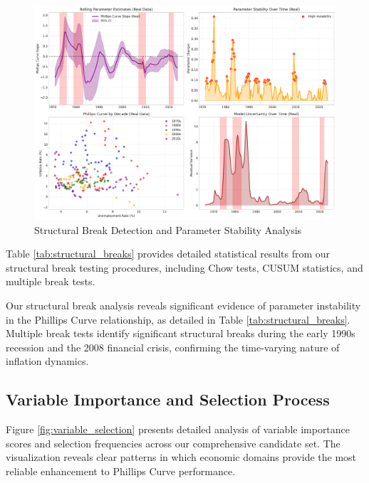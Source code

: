 \documentclass[12pt]{article}
\begin{document}
\begin{figure}[H]
\centering
\includegraphics[width=\textwidth]{../figures/structural_breaks.pdf}
\caption{Structural Break Detection and Parameter Stability Analysis}
\label{fig:structural_breaks}
\end{figure}

Table \ref{tab:structural_breaks} provides detailed statistical results from our structural break testing procedures, including Chow tests, CUSUM statistics, and multiple break tests.



Our structural break analysis reveals significant evidence of parameter instability in the Phillips Curve relationship, as detailed in Table \ref{tab:structural_breaks}. Multiple break tests identify significant structural breaks during the early 1990s recession and the 2008 financial crisis, confirming the time-varying nature of inflation dynamics.

\subsection{Variable Importance and Selection Process}

Figure \ref{fig:variable_selection} presents detailed analysis of variable importance scores and selection frequencies across our comprehensive candidate set. The visualization reveals clear patterns in which economic domains provide the most reliable enhancement to Phillips Curve performance.
\end{document}
